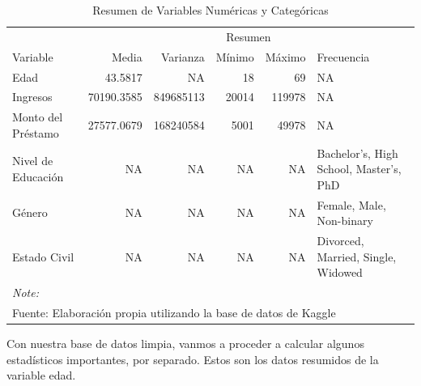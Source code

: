 \documentclass[
  letterpaper,
  DIV=11,
  numbers=noendperiod]{scrreprt}
\begin{document}
\begin{longtable}[t]{lrrrrl}
\caption{Resumen de Variables Numéricas y Categóricas}\\
\toprule
\multicolumn{1}{c}{ } & \multicolumn{5}{c}{Resumen} \\
\cmidrule(l{3pt}r{3pt}){2-6}
Variable & Media & Varianza & Mínimo & Máximo & Frecuencia\\
\midrule
Edad & 43.5817 & NA & 18 & 69 & NA\\
Ingresos & 70190.3585 & 849685113 & 20014 & 119978 & NA\\
Monto del Préstamo & 27577.0679 & 168240584 & 5001 & 49978 & NA\\
Nivel de Educación & NA & NA & NA & NA & Bachelor's, High School, Master's, PhD\\
Género & NA & NA & NA & NA & Female, Male, Non-binary\\
\addlinespace
Estado Civil & NA & NA & NA & NA & Divorced, Married, Single, Widowed\\
\bottomrule
\multicolumn{6}{l}{\rule{0pt}{1em}\textit{Note: }}\\
\multicolumn{6}{l}{\rule{0pt}{1em}Fuente: Elaboración propia utilizando la base de datos de Kaggle}\\
\end{longtable}

Con nuestra base de datos limpia, vanmos a proceder a calcular algunos
estadísticos importantes, por separado. Estos son los datos resumidos de
la variable edad.
\end{document}
